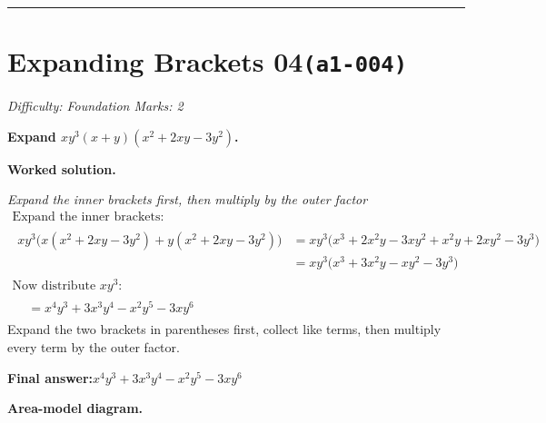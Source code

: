 \documentclass[11pt]{article}
\newcommand{\question}[1]{\par\medskip\noindent\textbf{#1}\par}
\begin{document}
\medskip\hrule

\section*{Expanding Brackets 04\quad\small\texttt{(a1-004)}}
\textit{Difficulty: Foundation \quad\textbar\quad Marks: 2}

\question{Expand \(xy^3(x+y)(x^2+2xy-3y^2)\).}

\textbf{Worked solution.}

\textit{Expand the inner brackets first, then multiply by the outer factor}
\[\begin{gathered}
\text{Expand the inner brackets:} \\[1em] \begin{aligned} xy^3\Big(x(x^2+2xy-3y^2)+y(x^2+2xy-3y^2)\Big) &= xy^3\Big(x^3+2x^2y-3xy^2+x^2y+2xy^2-3y^3\Big) \\ &= xy^3\Big(x^3+3x^2y-xy^2-3y^3\Big) \end{aligned} \\[1em] \text{Now distribute } xy^3\text{:} \\[1em] \begin{aligned} &= x^4y^3+3x^3y^4-x^2y^5-3xy^6 \end{aligned}
\end{gathered}\]
Expand the two brackets in parentheses first, collect like terms, then multiply every term by the outer factor.

\begin{answerbox}
\textbf{Final answer:}\quad \(\displaystyle x^4y^3+3x^3y^4-x^2y^5-3xy^6\)
\end{answerbox}
\textbf{Area-model diagram.}
\end{document}
